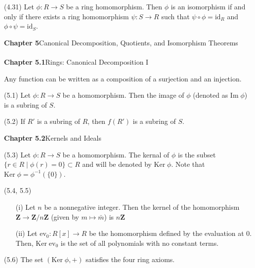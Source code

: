 \vspace{2ex}
\begin{cor}
(4.31) Let $\phi :R\rightarrow S$ be a ring homomorphism. Then $\phi $ is an isomorphism if and only if there exists a ring homomorphism $\psi :S\rightarrow R$ such that $\psi \circ\phi =\mathrm{id}_{R}$ and $\phi \circ \psi  =\mathrm{id}_{S}$. 
\end{cor}
\vspace{2ex}
{\bf Chapter 5}\hspace{2ex}Canonical Decomposition, Quotients, and Isomorphism Theorems\\\\
{\bf Chapter 5.1}\hspace{2ex}Rings: Canonical Decomposition I\\
\begin{rmk}
Any function can be written as a composition of a surjection and an injection.
\end{rmk}
\vspace{2ex}
\begin{prop}
(5.1) Let $\phi :R\rightarrow S$ be a homomorphism. Then the image of $\phi $ (denoted as $\mathrm{Im}\;\phi $) is a subring of $S$.
\end{prop}
\vspace{2ex}
\begin{rmk}
(5.2) If $R'$ is a subring of $R$, then $f(R')$ is a subring of $S$. 
\end{rmk}
\vspace{2ex}
{\bf Chapter 5.2}\hspace{2ex}Kernels and Ideals
\\
\begin{defi}
(5.3) Let $\phi :R\rightarrow S$ be a homomorphism. The kernal of $\phi $ is the subset $\{r\in R \;|\; \phi (r)=0\}\subset R$ and will be denoted by $\mathrm{Ker}\;\phi $. Note that $\mathrm{Ker}\;\phi =\phi ^{-1}(\{0\})$.
\end{defi}
\vspace{2ex}
\begin{ex}
(5.4, 5.5)
\begin{itemize}
\item[(i)] Let $n$ be a nonnegative integer. Then the kernel of the homomorphism ${\bm Z}\rightarrow {\bm Z}/n{\bm Z}$ (given by $m\mapsto \bar{m}$) is $n{\bm Z}$
\item[(ii)] Let $\mathrm{ev}_0:R[x]\rightarrow R$ be the homomorphism defined by the evaluation at 0. Then, $\mathrm{Ker}\;\mathrm{ev}_{0}$ is the set of all polynomials with no constant terms.
\end{itemize}
\end{ex}
\vspace{2ex}
\begin{prop}
(5.6) The set $(\mathrm{Ker}\;\phi ,+)$ satisfies the four ring axioms. 
\end{prop}
\vspace{2ex}

